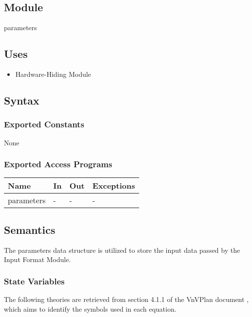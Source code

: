 \documentclass[12pt, titlepage]{article}
\begin{document}
\subsection{Module}
parameters

\subsection{Uses}
\begin{itemize}
    \item Hardware-Hiding Module
\end{itemize}

\subsection{Syntax}

\subsubsection{Exported Constants}
None
\subsubsection{Exported Access Programs}

\begin{center}
\begin{tabular}{p{2cm} p{4cm} p{4cm} p{2cm}}
\hline
\textbf{Name} & \textbf{In} & \textbf{Out} & \textbf{Exceptions} \\
\hline
parameters & - & - & - \\
\hline
\end{tabular}
\end{center}

\subsection{Semantics}
The parameters data structure is utilized to store the input data passed by the Input Format Module.
\subsubsection{State Variables}
The following theories are retrieved from section 4.1.1 of the VnVPlan document \cite{VNV2024}, which aims to identify the symbols used in each equation.
\end{document}
